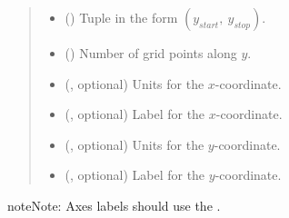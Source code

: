 \documentclass[letterpaper,10pt,english]{sphinxmanual}
\begin{document}
\begin{fulllineitems}
\begin{fulllineitems}
\begin{quote}
\begin{description}
\begin{itemize}
\item {} 
 () \textendash{} Tuple in the form \((y_{start}, ~ y_{stop})\).

\item {} 
 () \textendash{} Number of grid points along \(y\).

\item {} 
 (, optional) \textendash{} Units for the \(x\)-coordinate.

\item {} 
 (, optional) \textendash{} Label for the \(x\)-coordinate.

\item {} 
 (, optional) \textendash{} Units for the \(y\)-coordinate.

\item {} 
 (, optional) \textendash{} Label for the \(y\)-coordinate.

\end{itemize}

\end{description}\end{quote}

\begin{sphinxadmonition}{note}{Note:}
Axes labels should use the .
\end{sphinxadmonition}

\end{fulllineitems}


\end{fulllineitems}

\end{document}

